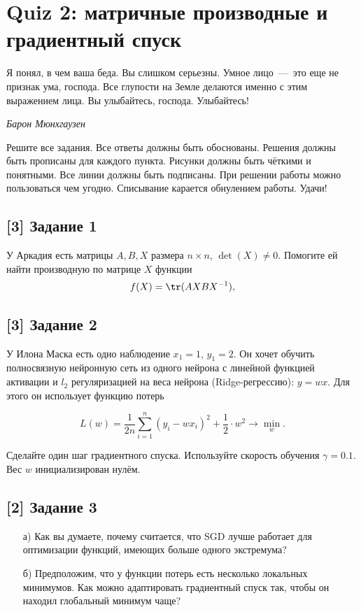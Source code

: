 \documentclass[12pt, a4paper, oneside]{article}
\begin{document}
\section*{Quiz 2: матричные производные и градиентный спуск}

\epigraph{Я понял, в чем ваша беда. Вы слишком серьезны. Умное лицо~---~это еще не признак ума, господа. Все глупости на Земле делаются именно с этим выражением лица. Вы улыбайтесь, господа. Улыбайтесь!}{\textit{Барон Мюнхгаузен}}

Решите все задания. Все ответы должны быть обоснованы. Решения должны быть прописаны для каждого пункта. Рисунки должны быть чёткими и понятными. Все линии должны быть подписаны. При решении работы можно пользоваться чем угодно. Списывание карается обнулением работы. Удачи! 

\vspace{-0.5cm}
\subsection*{[3] Задание 1}
\vspace{-0.5cm}

У Аркадия есть матрицы  $A,B,X$ размера $n \times n$, $\det(X) \ne 0.$ Помогите ей найти производную по матрице $X$ функции 
\[
f(X) = \tr(AXBX^{-1}),
\]

\vspace{-1cm}
\subsection*{[3] Задание 2}
\vspace{-0.5cm}

У Илона Маска есть одно наблюдение $x_1 = 1$, $y_1 = 2$. Он хочет обучить полносвязную нейронную сеть из одного нейрона с линейной функцией активации и $l_2$ регуляризацией на веса нейрона (Ridge-регрессию): $y = w x$. Для этого он использует функцию потерь 

\[
L(w) = \frac{1}{2n} \sum_{i=1}^n (y_i - w x_i)^2 +  \frac{1}{2} \cdot w^2 \to \min_{w}.
\]

Сделайте один шаг градиентного спуска. Используйте скорость обучения $\gamma = 0.1$. Вес $w$ инициализирован нулём.

\vspace{-0.7cm}
\subsection*{[2] Задание 3}
\vspace{-0.5cm}
\begin{enumerate}
    \item[а)] Как вы думаете, почему считается, что SGD лучше работает для оптимизации функций, имеющих больше одного экстремума?
    \item[б)] Предположим, что у функции потерь есть несколько локальных минимумов. Как можно адаптировать градиентный спуск так, чтобы он находил глобальный минимум чаще?
\end{enumerate}
\end{document}
